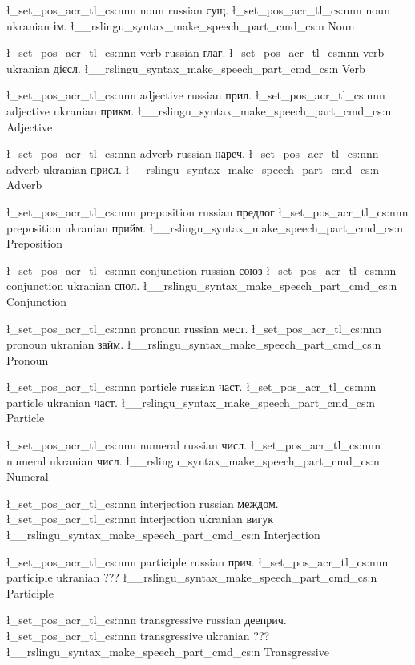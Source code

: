 

\l_set_pos_acr_tl_cs:nnn { noun } { russian } { сущ. } 
\l_set_pos_acr_tl_cs:nnn { noun } { ukranian } { ім. }
\l__rslingu_syntax_make_speech_part_cmd_cs:n { Noun }



\l_set_pos_acr_tl_cs:nnn { verb } { russian } { глаг. }
\l_set_pos_acr_tl_cs:nnn { verb } { ukranian } { дієсл. }
\l__rslingu_syntax_make_speech_part_cmd_cs:n { Verb }



\l_set_pos_acr_tl_cs:nnn { adjective } { russian } { прил. }
\l_set_pos_acr_tl_cs:nnn { adjective } { ukranian } { прикм. }
\l__rslingu_syntax_make_speech_part_cmd_cs:n { Adjective }



\l_set_pos_acr_tl_cs:nnn { adverb } { russian } { нареч. }
\l_set_pos_acr_tl_cs:nnn { adverb } { ukranian } { присл. }
\l__rslingu_syntax_make_speech_part_cmd_cs:n { Adverb }



\l_set_pos_acr_tl_cs:nnn { preposition } { russian } { предлог }
\l_set_pos_acr_tl_cs:nnn { preposition } { ukranian } { прийм. }
\l__rslingu_syntax_make_speech_part_cmd_cs:n { Preposition }



\l_set_pos_acr_tl_cs:nnn { conjunction } { russian } { союз }
\l_set_pos_acr_tl_cs:nnn { conjunction } { ukranian } { спол. }
\l__rslingu_syntax_make_speech_part_cmd_cs:n { Conjunction }



\l_set_pos_acr_tl_cs:nnn { pronoun } { russian } { мест. }
\l_set_pos_acr_tl_cs:nnn { pronoun } { ukranian } { займ. }
\l__rslingu_syntax_make_speech_part_cmd_cs:n { Pronoun }



\l_set_pos_acr_tl_cs:nnn { particle } { russian } { част. }
\l_set_pos_acr_tl_cs:nnn { particle } { ukranian } { част. }
\l__rslingu_syntax_make_speech_part_cmd_cs:n { Particle }



\l_set_pos_acr_tl_cs:nnn { numeral } { russian } { числ. }
\l_set_pos_acr_tl_cs:nnn { numeral } { ukranian } { числ. }
\l__rslingu_syntax_make_speech_part_cmd_cs:n { Numeral }



\l_set_pos_acr_tl_cs:nnn { interjection } { russian } { междом. }
\l_set_pos_acr_tl_cs:nnn { interjection } { ukranian } { вигук }
\l__rslingu_syntax_make_speech_part_cmd_cs:n { Interjection }



\l_set_pos_acr_tl_cs:nnn { participle } { russian } { прич. }
\l_set_pos_acr_tl_cs:nnn { participle } { ukranian } { ??? }
\l__rslingu_syntax_make_speech_part_cmd_cs:n { Participle }



\l_set_pos_acr_tl_cs:nnn { transgressive } { russian } { дееприч. }
\l_set_pos_acr_tl_cs:nnn { transgressive } { ukranian } { ??? }
\l__rslingu_syntax_make_speech_part_cmd_cs:n { Transgressive }


\ExplSyntaxOff

